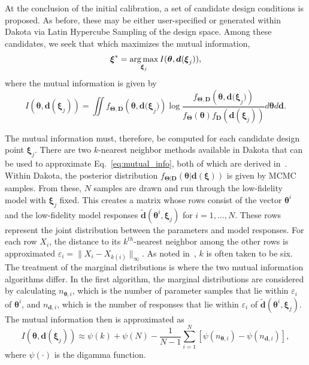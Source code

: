 At the conclusion of the initial calibration, a set of candidate design
conditions is proposed. As before, these may be either user-specified or
generated within Dakota via Latin Hypercube Sampling of the design space. Among
these candidates, we seek that which maximizes the mutual information,
\begin{equation}
\boldsymbol{\xi}^{*} = \operatorname*{arg\,max}_{\boldsymbol{\xi}_{j}} I(\boldsymbol{\theta},
\boldsymbol{d}(\boldsymbol{\xi}_{j}) ),
\end{equation}
where the mutual information is given by
\begin{equation}
I(\boldsymbol{\theta}, \boldsymbol{d}(\boldsymbol{\xi}_{j})) = \iint 
{f_{\boldsymbol{\Theta ,D}}}\left( \boldsymbol{\theta ,d(\xi}_{j}) \right)
\log \frac{ {f_{\boldsymbol{\Theta,D}}}\left( \boldsymbol{\theta,d(\xi}_{j}) 
\right)}{f_{\boldsymbol{\Theta}}\left(\boldsymbol{\theta} \right) 
f_{\boldsymbol{D}}\left(\boldsymbol{d}(\boldsymbol{\xi}_{j}) \right) }
d\boldsymbol{\theta} d\boldsymbol{d}.
\label{eq:mutual_info}
\end{equation}

The mutual information must, therefore, be computed for each candidate design 
point $\boldsymbol{\xi}_{j}$. There are two $k$-nearest neighbor methods 
available in Dakota that can be used to approximate Eq.~\ref{eq:mutual_info}, 
both of which are derived in~\cite{Kra04}. Within Dakota, the posterior 
distribution 
$f_{\boldsymbol{\Theta | D}}\left(\boldsymbol{\theta | d(\xi)}\right)$ is given
by MCMC samples. From these, $N$ samples are drawn and run through the
low-fidelity model with $\boldsymbol{\xi}_{j}$ fixed. This creates a matrix 
whose rows consist of the vector $\boldsymbol{\theta}^{i}$ and the low-fidelity
model responses $\tilde{\boldsymbol{d}}(\boldsymbol{\theta}^{i}, 
\boldsymbol{\xi}_{j})$ for $i = 1, \ldots, N$. These rows 
represent the joint distribution between the parameters and model responses. 
For each row $X_{i}$, the distance to its $k^{th}$-nearest neighbor among the 
other rows is approximated $\varepsilon_{i} = \| X_{i} - X_{k(i)} \|_{\infty}$. 
As noted in~\cite{Lew16}, $k$ is often taken to be six. The treatment of the 
marginal distributions is where the two mutual information algorithms differ. 
In the first algorithm, the marginal distributions are considered by 
calculating $n_{\boldsymbol{\theta},i}$, which is the number of parameter 
samples that lie within $\varepsilon_{i}$ of $\boldsymbol{\theta}^{i}$, and 
$n_{\boldsymbol{d},i}$, which is the number of responses that lie within 
$\varepsilon_{i}$ of $\tilde{\boldsymbol{d}}(\boldsymbol{\theta}^{i}, 
\boldsymbol{\xi}_{j})$. The mutual information then is approximated 
as~\cite{Kra04}
\begin{equation}
\label{eq:ksg1}
I(\boldsymbol{\theta}, \boldsymbol{d}(\boldsymbol{\xi}_{j})) \approx
\psi(k) + \psi(N) - \frac{1}{N-1} \sum_{i = 1}^{N} \left[ 
\psi(n_{\boldsymbol{\theta},i}) - \psi(n_{\boldsymbol{d},i}) \right],
\end{equation}
where $\psi(\cdot)$ is the digamma function. 

